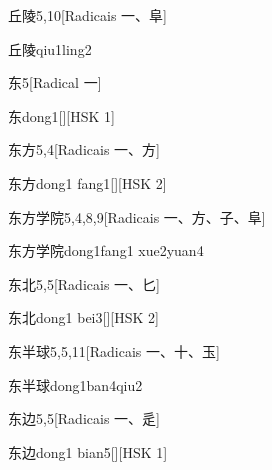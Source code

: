 \begin{entry}{丘陵}{5,10}[Radicais ⼀、⾩]
  \begin{phonetics}{丘陵}{qiu1ling2}
  \end{phonetics}
\end{entry}

\begin{entry}{东}{5}[Radical ⼀]
  \begin{phonetics}{东}{dong1}[][HSK 1]
  \end{phonetics}
\end{entry}

\begin{entry}{东方}{5,4}[Radicais ⼀、⽅]
  \begin{phonetics}{东方}{dong1 fang1}[][HSK 2]
  \end{phonetics}
\end{entry}

\begin{entry}{东方学院}{5,4,8,9}[Radicais ⼀、⽅、⼦、⾩]
  \begin{phonetics}{东方学院}{dong1fang1 xue2yuan4}
  \end{phonetics}
\end{entry}

\begin{entry}{东北}{5,5}[Radicais ⼀、⼔]
  \begin{phonetics}{东北}{dong1 bei3}[][HSK 2]
  \end{phonetics}
\end{entry}

\begin{entry}{东半球}{5,5,11}[Radicais ⼀、⼗、⽟]
  \begin{phonetics}{东半球}{dong1ban4qiu2}
  \end{phonetics}
\end{entry}

\begin{entry}{东边}{5,5}[Radicais ⼀、⾡]
  \begin{phonetics}{东边}{dong1 bian5}[][HSK 1]
  \end{phonetics}
\end{entry}

